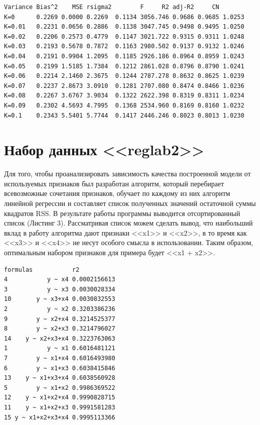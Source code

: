 \documentclass[]{article}
\numberwithin{equation}{section}
\begin{document}
    \begin{lstlisting}[style = TEXTstyle, caption = Сводка по алгоритму гребневой регрессии]
       Variance Bias^2    MSE rsigma2        F     R2 adj-R2     CN
K=0      0.2269 0.0000 0.2269  0.1134 3056.746 0.9686 0.9685 1.0253
K=0.01   0.2231 0.0656 0.2886  0.1138 3047.745 0.9498 0.9495 1.0250
K=0.02   0.2206 0.2573 0.4779  0.1147 3021.722 0.9315 0.9311 1.0248
K=0.03   0.2193 0.5678 0.7872  0.1163 2980.502 0.9137 0.9132 1.0246
K=0.04   0.2191 0.9904 1.2095  0.1185 2926.186 0.8964 0.8959 1.0243
K=0.05   0.2199 1.5185 1.7384  0.1212 2861.028 0.8796 0.8790 1.0241
K=0.06   0.2214 2.1460 2.3675  0.1244 2787.278 0.8632 0.8625 1.0239
K=0.07   0.2237 2.8673 3.0910  0.1281 2707.080 0.8474 0.8466 1.0236
K=0.08   0.2267 3.6767 3.9034  0.1322 2622.398 0.8319 0.8311 1.0234
K=0.09   0.2302 4.5693 4.7995  0.1368 2534.960 0.8169 0.8160 1.0232
K=0.1    0.2343 5.5401 5.7744  0.1417 2446.246 0.8023 0.8013 1.0230
    \end{lstlisting}

    \section{Набор данных <<reglab2>>}

    Для того, чтобы проанализировать зависимость качества построенной модели от используемых признаков был разработан алгоритм, который перебирает всевозможные сочетания признаков, обучает по каждому из них алгоритм линейной регрессии и составляет список полученных значений остаточной суммы квадратов RSS. В результате работы программы выводится отсортированный список (Листинг 3). Рассматривая список можем сделать вывод, что наибольший вклад в работу алгоритма дают признаки <<x1>> и <<x2>>, в то время как <<x3>> и <<x4>> не несут особого смысла в использовании. Таким образом, оптимальным набором признаков для примера будет <<x1 + x2>>.

    \begin{lstlisting}[style = TEXTstyle, caption = Результат работы программы]
          formulas           r2
4           y ~ x4 0.0002156613
3           y ~ x3 0.0030028334
10       y ~ x3+x4 0.0030832553
2           y ~ x2 0.3203386236
9        y ~ x2+x4 0.3214525377
8        y ~ x2+x3 0.3214796027
14    y ~ x2+x3+x4 0.3223763063
1           y ~ x1 0.6016481121
7        y ~ x1+x4 0.6016493980
6        y ~ x1+x3 0.6038415846
13    y ~ x1+x3+x4 0.6038560928
5        y ~ x1+x2 0.9986369522
12    y ~ x1+x2+x4 0.9990828715
11    y ~ x1+x2+x3 0.9991581283
15 y ~ x1+x2+x3+x4 0.9995113366
    \end{lstlisting}
\end{document}
